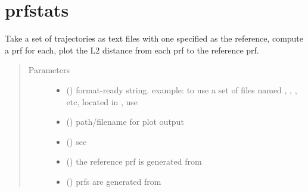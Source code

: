 \documentclass[letterpaper,10pt,openany,oneside,english]{sphinxmanual}
\begin{document}
\section{prfstats}
\label{\detokenize{prfstats:prfstats}}\label{\detokenize{prfstats::doc}}\label{\detokenize{prfstats:module-prfstats}}

\begin{fulllineitems}
\label{\detokenize{prfstats:prfstats.plot_dists_to_ref}}
Take a set of trajectories as text files with one specified as the
reference, compute a prf for each, plot the L2 distance from each prf
to the reference prf.
\begin{quote}\begin{description}
\item[{Parameters}] \leavevmode\begin{itemize}
\item {} 
 () \textendash{} format-ready string. example: to use a set of files named
, , , etc, located in
, use 

\item {} 
 () \textendash{} path/filename for plot output

\item {} 
 () \textendash{} see {\hyperref[\detokenize{phomology:phomology.build_filtration.build_filtration}]{}}

\item {} 
 () \textendash{} the reference prf is generated from 

\item {} 
 () \textendash{} prfs are generated from 


\end{itemize}
\end{description}
\end{quote}
\end{fulllineitems}
\end{document}
